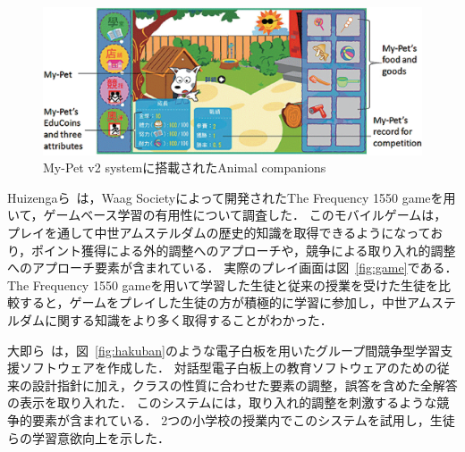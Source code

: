 \begin{figure}[hb]
	\begin{center}
	\includegraphics[width=15cm]{images/2/AnimalCompanions.eps}
	\caption{My-Pet v2 systemに搭載されたAnimal companions}
	\label{fig:animal_companions}
	\end{center}
\end{figure}

Huizengaら~\cite{huizenga2009mobile}は，Waag Societyによって開発されたThe Frequency 1550 gameを用いて，ゲームベース学習の有用性について調査した．
このモバイルゲームは，プレイを通して中世アムステルダムの歴史的知識を取得できるようになっており，ポイント獲得による外的調整へのアプローチや，競争による取り入れ的調整へのアプローチ要素が含まれている．
実際のプレイ画面は図~\ref{fig:game}である．
The Frequency 1550 gameを用いて学習した生徒と従来の授業を受けた生徒を比較すると，ゲームをプレイした生徒の方が積極的に学習に参加し，中世アムステルダムに関する知識をより多く取得することがわかった．

大即ら~\cite{otsuki}は，図~\ref{fig:hakuban}のような電子白板を用いたグループ間競争型学習支援ソフトウェアを作成した．
対話型電子白板上の教育ソフトウェアのための従来の設計指針に加え，クラスの性質に合わせた要素の調整，誤答を含めた全解答の表示を取り入れた．
このシステムには，取り入れ的調整を刺激するような競争的要素が含まれている．
2つの小学校の授業内でこのシステムを試用し，生徒らの学習意欲向上を示した．



